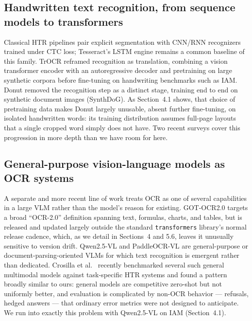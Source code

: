 \documentclass[12pt]{article}
\begin{document}
\subsection{Handwritten text recognition, from sequence models to transformers}

Classical HTR pipelines pair explicit segmentation with CNN/RNN recognizers trained under CTC loss; Tesseract's
LSTM engine \citep{Smith2007Tesseract} remains a common baseline of this family. TrOCR \citep{Li2023TrOCR}
reframed recognition as translation, combining a vision transformer encoder with an autoregressive decoder
and pretraining on large synthetic corpora before fine-tuning on handwriting benchmarks such as IAM. Donut
\citep{Kim2022Donut} removed the recognition step as a distinct stage, training end to end on synthetic
document images (SynthDoG). As Section~4.1 shows, that choice of pretraining data makes Donut largely
unusable, absent further fine-tuning, on isolated handwritten words: its training distribution assumes
full-page layouts that a single cropped word simply does not have. Two recent surveys
\citep{GarridoMunoz2026Survey,AlKendi2024Survey} cover this progression in more depth than we have room for
here.

\subsection{General-purpose vision-language models as OCR systems}

A separate and more recent line of work treats OCR as one of several capabilities in a large VLM rather
than the model's reason for existing. GOT-OCR2.0 \citep{Wei2024GOTOCR} targets a broad ``OCR-2.0''
definition spanning text, formulas, charts, and tables, but is released and updated largely outside the
standard \texttt{transformers} library's normal release cadence, which, as we detail in Sections~4 and 5.6,
leaves it unusually sensitive to version drift. Qwen2.5-VL \citep{Bai2025Qwen} and
PaddleOCR-VL \citep{Cui2025PaddleOCRVL} are general-purpose or document-parsing-oriented VLMs for which text
recognition is emergent rather than dedicated. Crosilla et al.\ \citep{Crosilla2025LLMHTR} recently
benchmarked several such general multimodal models against task-specific HTR systems and found a pattern
broadly similar to ours: general models are competitive zero-shot but not uniformly better, and evaluation
is complicated by non-OCR behavior --- refusals, hedged answers --- that ordinary error metrics were not
designed to anticipate. We run into exactly this problem with Qwen2.5-VL on IAM (Section~4.1).
\end{document}
